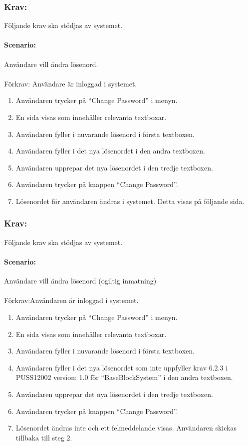 \documentclass[paper=a4, fontsize=11pt,twoside]{article}
\begin{document}
 \subsubsection{Krav:} Följande krav ska stödjas av systemet.
 \paragraph{Scenario:}Användare vill ändra lösenord.
 \paragraph{}
 Förkrav: Användare är inloggad i systemet.
 
 \begin{enumerate}
 \item	Användaren trycker på “Change Password” i menyn.
 \item	En sida visas som innehåller relevanta textboxar.
 \item	Användaren fyller i nuvarande lösenord i första textboxen.
 \item	Användaren fyller i det nya lösenordet i den andra textboxen.
 \item	Användaren upprepar det nya lösenordet i den tredje textboxen.
 \item	Användaren trycker på knappen “Change Password”.
 \item	Lösenordet för användaren ändras i systemet. Detta visas på följande sida.
 	
 \end{enumerate}
 
  \subsubsection{Krav:}Följande krav ska stödjas av systemet.
  \paragraph{Scenario:}Användare vill ändra lösenord (ogiltig inmatning)
  \paragraph{}
  Förkrav:Användaren är inloggad i systemet.
  \begin{enumerate}
 \item  Användaren trycker på “Change Password” i menyn.
 \item	 En sida visas som innehåller relevanta textboxar.
 \item	Användaren fyller i nuvarande lösenord i första textboxen.
 \item	Användaren fyller i det nya lösenordet som inte uppfyller krav 6.2.3 i PUSS12002 version: 1.0 för “BaseBlockSystem” i den andra textboxen.
 \item	Användaren upprepar det nya lösenordet i den tredje textboxen.
 \item	Användaren trycker på knappen “Change Password”.
 \item	Lösenordet ändras inte och ett felmeddelande visas. Användaren skickas tillbaka till steg 2.
  	
  \end{enumerate}
 
\end{document}
